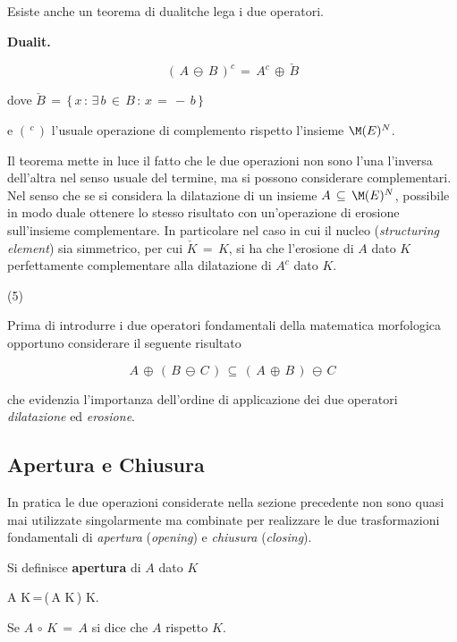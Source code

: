 Esiste anche un teorema di dualit\a che lega i due operatori.

\bth
{\bf Dualit\a.}

$$
(\,A\,\ominus\,B\,)^c\,=\,A^c\,\oplus\,\check{B} 
$$

dove $\check{B}\,=\,\{\,x\,:\,\exists\,b\,\in\,B\,:\,x\,=\,-\,b\,\}$

e $(\,^c\,)$ \e l'usuale operazione di complemento rispetto l'insieme $\M(E)^N$.
\eth

Il teorema mette in luce il fatto che le due operazioni non sono l'una l'inversa
dell'altra nel senso usuale del termine, ma si possono considerare complementari.
Nel senso che se si considera la dilatazione di un insieme $A\,\subseteq\,\M(E)^N$,
\e possibile in modo duale ottenere lo stesso risultato con un'operazione di
erosione sull'insieme complementare.
In particolare nel caso in cui il nucleo ({\it structuring element}) sia simmetrico,
per cui $\check{K}\,=\,K$, si ha che l'erosione di $A$ dato $K$ \e perfettamente
complementare alla dilatazione di $A^c$ dato $K$.

\vs(5)

Prima di introdurre i due operatori fondamentali della matematica morfologica
\e opportuno considerare il seguente risultato

\bpr

$$
A\,\oplus\,(\,B\,\ominus\,C\,)\,\subseteq\,(\,A\,\oplus\,B\,)\,\ominus\,C
$$

\epr

che evidenzia l'importanza dell'ordine di applicazione dei due operatori {\it dilatazione}
ed {\it erosione}.

\subsection{Apertura e Chiusura}

In pratica le due operazioni considerate nella sezione precedente non sono quasi mai
utilizzate singolarmente ma combinate per realizzare le due trasformazioni fondamentali 
di {\it apertura} ({\it opening}) e {\it chiusura} ({\it closing}).

\bdf

Si definisce {\bf apertura} di $A$ dato $K$

\be
A\,\circ\,K\,=\,(\,A\,\ominus\,K\,)\,\oplus\,K.
\ee

Se $A\,\circ\,K\,=\,A$ si dice che $A$  rispetto $K$.

